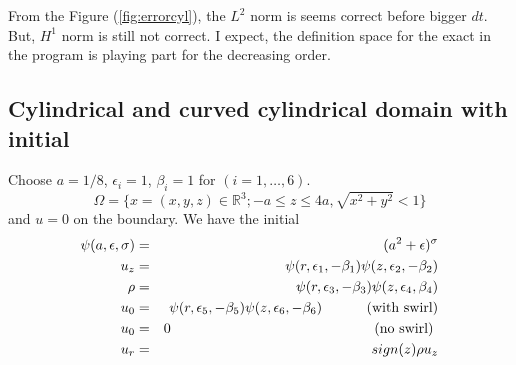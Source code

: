 \documentclass[a4paper]{article}
\newcommand{\R}{\mathbb{R}}
\begin{document}
From the Figure (\ref{fig:errorcyl}), the $ L^{2} $ norm is seems correct before bigger $ dt $. But, $ H^{1} $ norm is still not correct. I expect, the definition space for the exact in the program is playing part for the decreasing order.

\subsection{Cylindrical and curved cylindrical domain with initial}
Choose $ a=1/8 $, $ \epsilon_{i}=1 $, $ \beta_{i}=1 $ for $ (i=1, \dots,6) $.
\[ \Omega = \{ x=(x,y,z) \in \R^3 ; -a\leq z \leq 4a, \sqrt{x^2+y^2} < 1 \} \]
and $ u=0 $ on the boundary. We have the initial
\begin{eqnarray}\nonumber
\psi(a,\epsilon,\sigma) &=& (a^{2}+\epsilon)^{\sigma}\\ \nonumber
u_{z} &=& \psi(r,\epsilon_{1},-\beta_{1})\psi(z,\epsilon_{2},-\beta_{2})\\ \nonumber
\rho &=& \psi(r,\epsilon_{3},-\beta_{3})\psi(z,\epsilon_{4},\beta_{4})\\ \nonumber
u_{0} &=& \psi(r,\epsilon_{5},-\beta_{5})\psi(z,\epsilon_{6},-\beta_{6}) \text{\hspace{1cm} (with swirl)}\\ \nonumber
u_{0} &=& 0 \text{ \hspace{5cm}(no swirl) }\\ \nonumber
u_{r} &=& sign(z)\rho u_{z}
\end{eqnarray}
\end{document}

